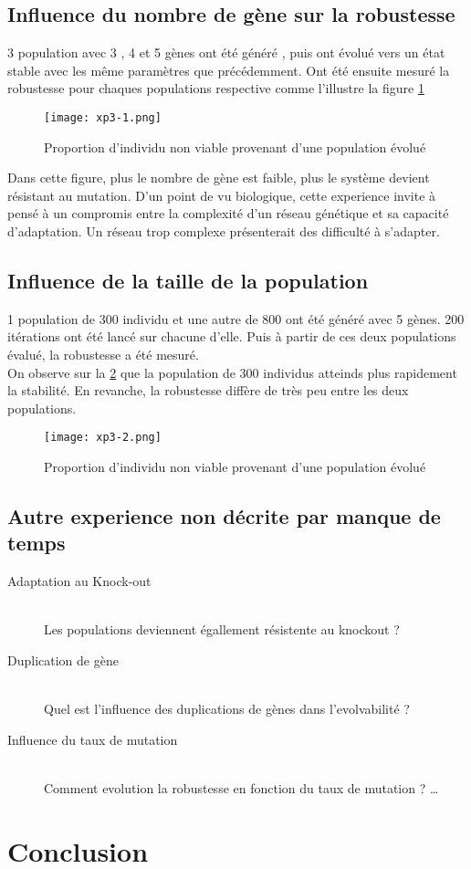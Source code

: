 \documentclass{article}
\begin{document}
	 \newpage

	\subsection{Influence du nombre de gène sur la robustesse}
	3 population avec  3 , 4 et 5 gènes ont été généré , puis ont évolué vers un état stable avec les même paramètres que précédemment. 
	Ont été ensuite mesuré la robustesse pour chaques populations respective comme l'illustre la figure \ref{xp3.1}

	\begin{figure}[h]
	\label{xp3.1}
	\centering
	\caption[test]{Proportion d'individu non viable provenant d'une population évolué }
	\texttt{[image: xp3-1.png]}
	\end{figure}


	Dans cette figure, plus le nombre de gène est faible, plus le système devient résistant au mutation. D'un point de vu biologique, cette experience invite à pensé à un compromis entre la complexité d'un réseau génétique et sa capacité d'adaptation. Un réseau trop complexe présenterait des difficulté à s'adapter.  \\


	\subsection{Influence de la taille de la population}
	1 population de 300 individu et une autre de 800 ont été généré avec 5 gènes. 200 itérations ont été lancé sur chacune d'elle. Puis à partir de ces deux populations évalué, la robustesse a été mesuré. \\
	On observe sur la \ref{xp3.2} que la population de 300 individus atteinds plus rapidement la stabilité. En revanche, la robustesse diffère de très peu entre les deux populations. 


	\begin{figure}[h]
	\label{xp3.2}
	\centering
	\caption[test]{Proportion d'individu non viable provenant d'une population évolué }
	\texttt{[image: xp3-2.png]}
	\end{figure}

	\subsection{Autre experience non décrite par manque de temps}
	\begin{description}
	  \item[Adaptation au Knock-out] \hfill \\
	  Les populations deviennent égallement résistente au knockout ?
	  \item[Duplication de gène] \hfill \\
	  Quel est l'influence des duplications de gènes dans l'evolvabilité ? 
	  \item[Influence du taux de mutation] \hfill \\
	  Comment evolution la robustesse en fonction du taux de mutation ? \ldots
	\end{description}


	\section{Conclusion}



	
\end{document}
